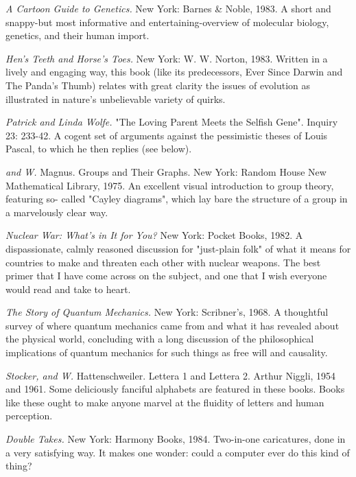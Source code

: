  {\sl A Cartoon Guide to Genetics.} New York: Barnes \& Noble, 1983. A short and snappy-but most informative and entertaining-overview of molecular biology, genetics, and their human import.

 {\sl Hen's Teeth and Horse's Toes.} New York: W. W. Norton, 1983. Written in a lively and engaging way, this book (like its predecessors, Ever Since Darwin and The Panda's Thumb) relates with great clarity the issues of evolution as illustrated in nature's unbelievable variety of quirks.

 {\sl Patrick and Linda Wolfe.} "The Loving Parent Meets the Selfish Gene". Inquiry 23: 233-42. A cogent set of arguments against the pessimistic theses of Louis Pascal, to which he then replies (see below).

 {\sl and W.} Magnus. Groups and Their Graphs. New York: Random House New Mathematical Library, 1975. An excellent visual introduction to group theory, featuring so- called "Cayley diagrams", which lay bare the structure of a group in a marvelously clear way.

 {\sl Nuclear War: What's in It for You?} New York: Pocket Books, 1982. A dispassionate, calmly reasoned discussion for "just-plain folk" of what it means for countries to make and threaten each other with nuclear weapons. The best primer that I have come across on the subject, and one that I wish everyone would read and take to heart.

 {\sl The Story of Quantum Mechanics.} New York: Scribner's, 1968. A thoughtful survey of where quantum mechanics came from and what it has revealed about the physical world, concluding with a long discussion of the philosophical implications of quantum mechanics for such things as free will and causality.

 {\sl Stocker, and W.} Hattenschweiler. Lettera 1 and Lettera 2. Arthur Niggli, 1954 and 1961. Some deliciously fanciful alphabets are featured in these books. Books like these ought to make anyone marvel at the fluidity of letters and human perception.

 {\sl Double Takes.} New York: Harmony Books, 1984. Two-in-one caricatures, done in a very satisfying way. It makes one wonder: could a computer ever do this kind of thing?

